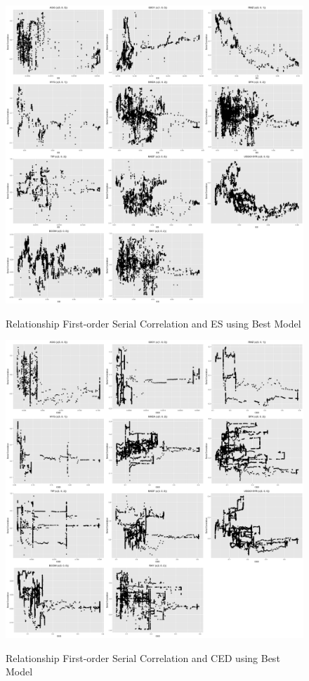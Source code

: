 \documentclass[12pt]{article}
\begin{document}
\begin{figure}
  \caption{Relationship First-order Serial Correlation and ES using Best Model}
  \includegraphics[width = \textwidth]{../figures/SerCol-ES2yr}
  \label{fig:SerCol-ES2yr}
\end{figure}

\begin{figure}
  \caption{Relationship First-order Serial Correlation and CED using Best Model}
  \includegraphics[width = \textwidth]{../figures/SerCol-CED3mon2yr}
  \label{fig:SerCol-CED3mon2yr}
\end{figure}
\end{document}
